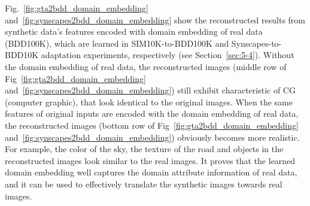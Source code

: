 \documentclass[runningheads]{llncs}
\begin{document}
Fig.~\ref{fig:gta2bdd_domain_embedding} and~\ref{fig:synscapes2bdd_domain_embedding} show the reconstructed results from synthetic data's features encoded with domain embedding of real data (BDD100K), which are learned in SIM10K-to-BDD100K and Synscapes-to-BDD10K adaptation experiments, respectively (see Section~\ref{sec:5-4}).
Without the domain embedding of real data, the reconstructed images (middle row of Fig~\ref{fig:gta2bdd_domain_embedding} and~\ref{fig:synscapes2bdd_domain_embedding}) still exhibit characteristic of CG (computer graphic), that look identical to the original images.
When the same features of original inputs are encoded with the domain embedding of real data, the reconstructed images (bottom row of Fig~\ref{fig:gta2bdd_domain_embedding} and~\ref{fig:synscapes2bdd_domain_embedding}) obviously becomes more realistic.
For example, the color of the sky, the texture of the road and objects in the reconstructed images look similar to the real images.
It proves that the learned domain embedding well captures the domain attribute information of real data, and it can be used to effectively translate the synthetic images towards real images.
\end{document}
